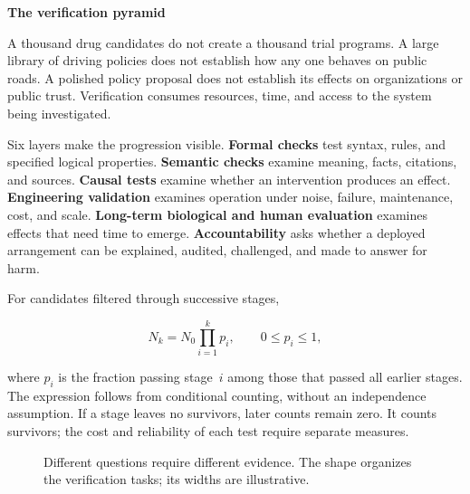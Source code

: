 \documentclass[11pt,openany]{book}
\newcommand{\term}[1]{\textbf{#1}}
\newcommand{\subhead}[1]{\par\medskip\noindent\textbf{#1}\par\nobreak\smallskip}
\begin{document}
\subhead{The verification pyramid}

A thousand drug candidates do not create a thousand trial programs. A large library of driving policies does not establish how any one behaves on public roads. A polished policy proposal does not establish its effects on organizations or public trust. Verification consumes resources, time, and access to the system being investigated.

Six layers make the progression visible. \term{Formal checks} test syntax, rules, and specified logical properties. \term{Semantic checks} examine meaning, facts, citations, and sources. \term{Causal tests} examine whether an intervention produces an effect. \term{Engineering validation} examines operation under noise, failure, maintenance, cost, and scale. \term{Long-term biological and human evaluation} examines effects that need time to emerge. \term{Accountability} asks whether a deployed arrangement can be explained, audited, challenged, and made to answer for harm.

For candidates filtered through successive stages,

\begin{equation}
N_k=N_0\prod_{i=1}^{k}p_i,
\qquad 0\leq p_i\leq1,
\end{equation}

where $p_i$ is the fraction passing stage~$i$ among those that passed all earlier stages. The expression follows from conditional counting, without an independence assumption. If a stage leaves no survivors, later counts remain zero. It counts survivors; the cost and reliability of each test require separate measures.

\begin{figure}[ht]
\centering
{}
\caption{Different questions require different evidence. The shape organizes the verification tasks; its widths are illustrative.}
\label{fig:verification-pyramid}
\end{figure}
\end{document}
